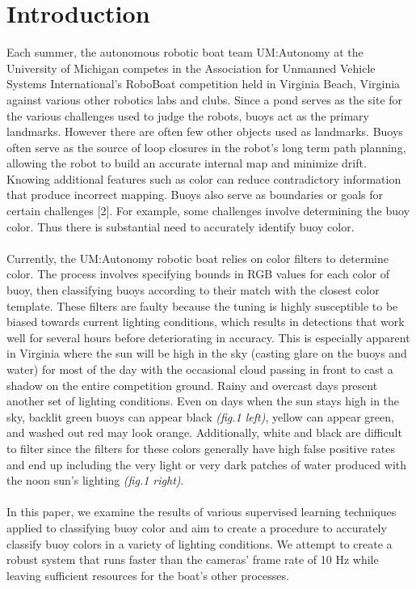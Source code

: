 \documentclass{article} %
\begin{document}
\section{Introduction}
Each summer, the autonomous robotic boat team UM:Autonomy at the University of Michigan competes in the Association for Unmanned Vehicle Systems International's RoboBoat competition held in Virginia Beach, Virginia against various other robotics labs and clubs. Since a pond serves as the site for the various challenges used to judge the robots, buoys act as the primary landmarks. However there are often few other objects used as landmarks. Buoys often serve as the source of loop closures in the robot's long term path planning, allowing the robot to build an accurate internal map and minimize drift. Knowing additional features such as color can reduce contradictory information that produce incorrect mapping. Buoys also serve as boundaries or goals for certain challenges [2]. For example, some challenges involve determining the buoy color. Thus there is substantial need to accurately identify buoy color.
\\\\Currently, the UM:Autonomy robotic boat relies on color filters to determine color. The process involves specifying bounds in RGB values for each color of buoy, then classifying buoys according to their match with the closest color template. These filters are faulty because the tuning is highly susceptible to be biased towards current lighting conditions, which results in detections that work well for several hours before deteriorating in accuracy. This is especially apparent in Virginia where the sun will be high in the sky (casting glare on the buoys and water) for most of the day with the occasional cloud passing in front to cast a shadow on the entire competition ground. Rainy and overcast days present another set of lighting conditions. Even on days when the sun stays high in the sky, backlit green buoys can appear black \textit{(fig.1 left)}, yellow can appear green, and washed out red may look orange. Additionally, white and black are difficult to filter since the filters for these colors generally have high false positive rates and end up including the very light or very dark patches of water produced with the 
noon sun's lighting \textit{(fig.1 right)}.
\\\\In this paper, we examine the results of various supervised learning techniques applied to classifying buoy color and aim to create a procedure to accurately classify buoy colors in a variety of lighting conditions. We attempt to create a robust system that runs faster than the cameras' frame rate of 10 Hz while leaving sufficient resources for the boat's other processes.
\end{document}
